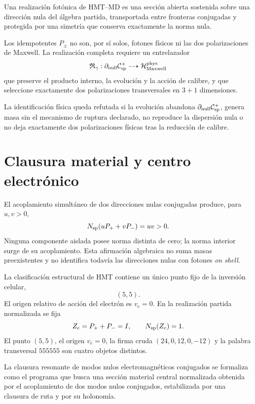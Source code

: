 \begin{definition}
\label{def:interfaz-fotonica-hmt-md}
Una realización fotónica de HMT--MD es una sección abierta sostenida sobre
una dirección nula del álgebra partida, transportada entre fronteras
conjugadas y protegida por una simetría que conserva exactamente la norma
nula.
\end{definition}

Los idempotentes \(P_\pm\) no son, por sí solos, fotones físicos ni las dos
polarizaciones de Maxwell. La realización completa requiere un
entrelazador
\[
 \mathfrak R_\gamma:
 \partial_{\rm null}\mathcal C_{\rm sp}^{+}
 \dashrightarrow\mathcal H_{\rm Maxwell}^{\rm phys}
\]
que preserve el producto interno, la evolución y la acción de calibre, y que
seleccione exactamente dos polarizaciones transversales en \(3+1\)
dimensiones.

\begin{criterion}
\label{crit:sector-fotonico}
La identificación física queda refutada si la evolución abandona
\(\partial_{\rm null}\mathcal C_{\rm sp}^{+}\), genera masa sin el mecanismo
de ruptura declarado, no reproduce la dispersión nula o no deja exactamente
dos polarizaciones físicas tras la reducción de calibre.
\end{criterion}

\section{Clausura material y centro electrónico}
\label{sec:clausura-material-electron}

El acoplamiento simultáneo de dos direcciones nulas conjugadas produce, para
\(u,v>0\),
\[
 N_{\rm sp}(uP_++vP_-)=uv>0.
\]
Ninguna componente aislada posee norma distinta de cero; la norma interior
surge de su acoplamiento. Esta afirmación algebraica no suma masas
preexistentes y no identifica todavía las direcciones nulas con fotones
\emph{on shell}.

   La clasificación estructural de HMT contiene un único punto fijo de la inversión celular,
\[
 (5,5).
\]
El origen relativo de acción del electrón es \(v_e=0\). En la realización
partida normalizada se fija
\[
 Z_e=P_++P_-=I,
 \qquad
 N_{\rm sp}(Z_e)=1.
\]
El punto \((5,5)\), el origen \(v_e=0\), la firma cruda
\((24,0,12,0,-12)\) y la palabra transversal \(555555\) son cuatro objetos
distintos.

\begin{definition}
\label{def:candidato-clausura-electronica}
La clausura resonante de modos nulos electromagnéticos conjugados se
formaliza como el programa que busca una sección material central normalizada
obtenida por el acoplamiento de dos modos nulos conjugados, estabilizada por
una clausura de ruta y por su holonomía.
\end{definition}

